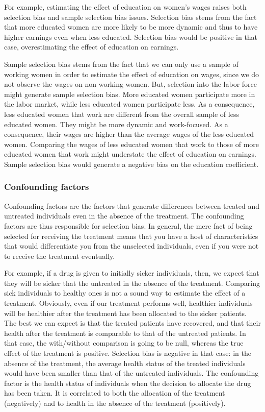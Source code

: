 \documentclass[]{book}
\theoremstyle{definition}
\theoremstyle{definition}
\theoremstyle{definition}
\theoremstyle{remark}
\begin{document}
For example, estimating the effect of education on women's wages raises both selection bias and sample selection bias issues.
Selection bias stems from the fact that more educated women are more likely to be more dynamic and thus to have higher earnings even when less educated.
Selection bias would be positive in that case, overestimating the effect of education on earnings.

Sample selection bias stems from the fact that we can only use a sample of working women in order to estimate the effect of education on wages, since we do not observe the wages on non working women.
But, selection into the labor force might generate sample selection bias.
More educated women participate more in the labor market, while less educated women participate less.
As a consequence, less educated women that work are different from the overall sample of less educated women.
They might be more dynamic and work-focused.
As a consequence, their wages are higher than the average wages of the less educated women.
Comparing the wages of less educated women that work to those of more educated women that work might understate the effect of education on earnings.
Sample selection bias would generate a negative bias on the education coefficient.

\hypertarget{confounding-factors}{%
\subsubsection{Confounding factors}\label{confounding-factors}}

Confounding factors are the factors that generate differences between treated and untreated individuals even in the absence of the treatment.
The confounding factors are thus responsible for selection bias.
In general, the mere fact of being selected for receiving the treatment means that you have a host of characteristics that would differentiate you from the unselected individuals, even if you were not to receive the treatment eventually.

For example, if a drug is given to initially sicker individuals, then, we expect that they will be sicker that the untreated in the absence of the treatment.
Comparing sick individuals to healthy ones is not a sound way to estimate the effect of a treatment.
Obviously, even if our treatment performs well, healthier individuals will be healthier after the treatment has been allocated to the sicker patients.
The best we can expect is that the treated patients have recovered, and that their health after the treatment is comparable to that of the untreated patients.
In that case, the with/without comparison is going to be null, whereas the true effect of the treatment is positive.
Selection bias is negative in that case: in the absence of the treatment, the average health status of the treated individuals would have been smaller than that of the untreated individuals.
The confounding factor is the health status of individuals when the decision to allocate the drug has been taken.
It is correlated to both the allocation of the treatment (negatively) and to health in the absence of the treatment (positively).
\end{document}
